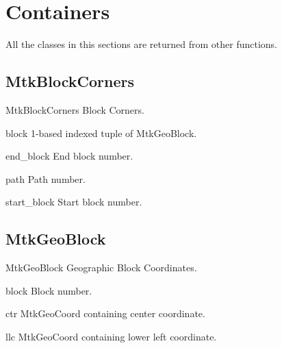 \documentclass{howto}
\begin{document}
\section{Containers \label {containers}}

  All the classes in this sections are returned from other functions.

\subsection{MtkBlockCorners \label{mtkblockcorners}}

\begin{classdesc*}{MtkBlockCorners}
  Block Corners.
\end{classdesc*}

\begin{memberdesc}[int]{block}
  1-based indexed tuple of MtkGeoBlock.
\end{memberdesc}

\begin{memberdesc}[int]{end_block}
  End block number.
\end{memberdesc}

\begin{memberdesc}[int]{path}
  Path number.
\end{memberdesc}

\begin{memberdesc}[int]{start_block}
  Start block number.
\end{memberdesc}

\subsection{MtkGeoBlock \label{mtkgeoblock}}

\begin{classdesc*}{MtkGeoBlock}
  Geographic Block Coordinates.
\end{classdesc*}

\begin{memberdesc}[int]{block}
  Block number.
\end{memberdesc}

\begin{memberdesc}[MtkGeoCoord]{ctr}
  MtkGeoCoord containing center coordinate.
\end{memberdesc}

\begin{memberdesc}[MtkGeoCoord]{llc}
  MtkGeoCoord containing lower left coordinate.
\end{memberdesc}
\end{document}
